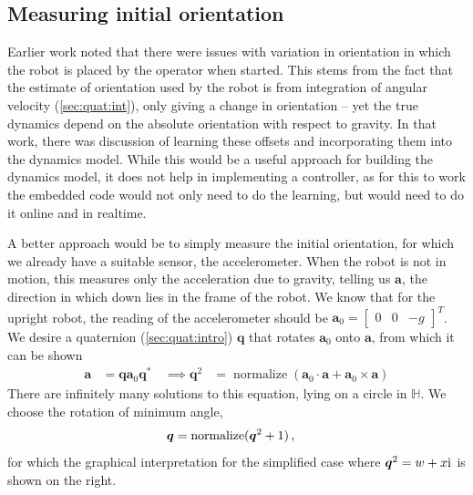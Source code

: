 \documentclass[main.tex]{subfiles}
\begin{document}
\subsection{Measuring initial orientation}
\label{sec:acc:orient}
	Earlier work \cite{aleksi} noted that there were issues with variation in orientation in which the robot is placed by the operator when started.
	This stems from the fact that the estimate of orientation used by the robot is from integration of angular velocity (\cref{sec:quat:int}), only giving a change in orientation -- yet the true dynamics depend on the absolute orientation with respect to gravity.
	In that work, there was discussion of learning these offsets and incorporating them into the dynamics model.
	While this would be a useful approach for building the dynamics model, it does not help in implementing a controller, as for this to work the embedded code would not only need to do the learning, but would need to do it online and in realtime.

	A better approach would be to simply measure the initial orientation, for which we already have a suitable sensor, the accelerometer. When the robot is not in motion, this measures only the acceleration due to gravity, telling us $\bm{a}$, the direction in which down lies in the frame of the robot.
	We know that for the upright robot, the reading of the accelerometer should be $\bm{a}_0 = \begin{bmatrix}0 & 0 & -g\end{bmatrix}^T$\footnotemark. We desire a quaternion (\cref{sec:quat:intro}) $\bm{q}$ that rotates $\bm{a}_0$ onto $\bm{a}$, from which it can be shown
	\begin{align}
		\bm{a} &= \bm{q}\bm{a}_0\bm{q}^*\, & \implies
		\bm{q}^2
			&= \operatorname{normalize}\left(
				\bm{a}_0 \cdot \bm{a} + \bm{a}_0 \times \bm{a}
			\right)
			\label{eq:quat-sqrt}
	\end{align}
	There are infinitely many solutions to this equation, lying on a circle in $\mathbb{H}$.
	We choose the rotation of minimum angle,
	\begin{align}
		\bm{q} &= \operatorname{normalize}(\bm{q}^2 + 1)\,, &
		\parbox{\linewidth/5}{%
			
		}
	\end{align}
	for which the  graphical interpretation for the simplified case where $\bm{q}^2 = w + x\mathrm{i}\mkern1mu$ is shown on the right.
\end{document}
